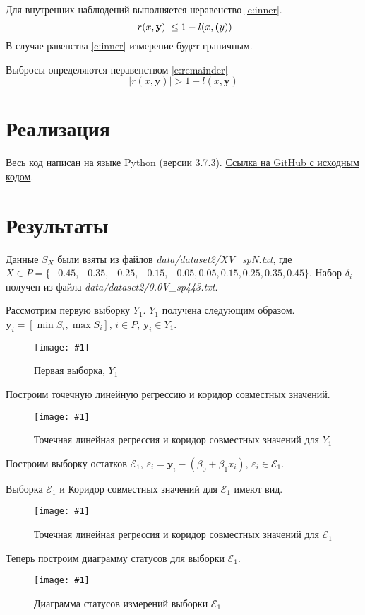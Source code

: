 \documentclass[a4paper,12pt]{article}
\newcommand{\plot}[3]{
    \begin{figure}[H]
        \begin{center}
            \texttt{[image: \#1]}
            \caption{#2}
            \label{#3}
        \end{center}
    \end{figure}
}
\begin{document}
    Для внутренних наблюдений выполняется неравенство \ref{e:inner}.
    \begin{equation}
        |r(x, \textbf{y})| \leq 1 - l(x, \textbf(y))
        \label{e:inner}
    \end{equation}
    В случае равенства \ref{e:inner} измерение будет граничным.

    Выбросы определяются неравенством \ref{e:remainder}
    \begin{equation}
        |r(x, \textbf{y})| > 1 + l(x, \textbf{y})
        \label{e:remainder}
    \end{equation}

    \section{Реализация}
    \quad Весь код написан на языке Python (версии 3.7.3).
    \href{https://github.com/kirillkuks/Intervals/tree/master/lab3}{Ссылка на GitHub с исходным кодом}.

    \section{Результаты}
    \quad Данные $ S_X $ были взяты из файлов \textsl{data/dataset2/XV\_spN.txt}, \newline
    где $ X \in P = \{-0.45, -0.35, -0.25, -0.15, -0.05, 0.05, 0.15, 0.25, 0.35, 0.45 \} $.
    Набор $ \delta_i $ получен из файла \textsl{data/dataset2/0.0V\_sp443.txt}.

    Рассмотрим первую выборку $ Y_1 $. $ Y_1 $ получена следующим образом.
    $ \textbf{y}_i = [\min{S_i}, \max{S_i}]$, $ i \in P $, $ \textbf{y}_i \in Y_1 $.
    \plot{SampleX1}{Первая выборка, $ Y_1 $}{p:sampleX1}

    Построим точечную линейную регрессию и коридор совместных значений.
    \plot{InformSetCorridorX1}{Точечная линейная регрессия и коридор совместных значений для $ Y_1 $}{p:informSetCorridorX1}

    Построим выборку остатков $ \mathcal{E}_1 $, $ \varepsilon_i = \textbf{y}_i - (\beta_0 + \beta_1 x_i) $,
    $ \varepsilon_i \in \mathcal{E}_1 $.

    Выборка $ \mathcal{E}_1 $ и Коридор совместных значений для $ \mathcal{E}_1 $ имеют вид.
    \plot{InformSetCorridorRemX1}{Точечная линейная регрессия и коридор совместных значений для $ \mathcal{E}_1 $}{p:informSetCorridorRemX1}

    Теперь построим диаграмму статусов для выборки $ \mathcal{E}_1 $.
    \plot{DiagramStatusX1}{Диаграмма статусов измерений выборки $ \mathcal{E}_1 $}{p:diagramStatusX1}
\end{document}
